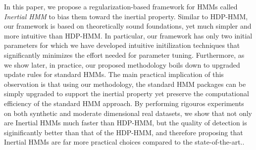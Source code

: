 In this paper, we propose a regularization-based framework for HMMs called
\emph{Inertial HMM} to bias them toward the inertial property. Similar to
HDP-HMM, our framework is based on theoretically sound foundations, yet much
simpler and more intuitive than HDP-HMM. In particular, our framework has only
two initial parameters for which we have developed intuitive initilization
techniques that significantly minimizes the effort needed for parameter tuning.
Furthermore, as we show later, in practice, our proposed
methodology boils down to upgraded update rules for standard HMMs. The main
practical implication of this observation is that using our methodology, the
standard HMM packages can be simply upgraded to support the inertial property yet preserve the
computational efficiency of the standard HMM approach. By performing rigouros
experiments on both synthetic and moderate dimensional real datasets, we show
that not only are Inertial HMMs much faster than HDP-HMM, but the quality of
detection is siginificantly better than that of the HDP-HMM, and therefore
proposing that Inertial HMMs are far more practical choices compared to the
state-of-the-art..
